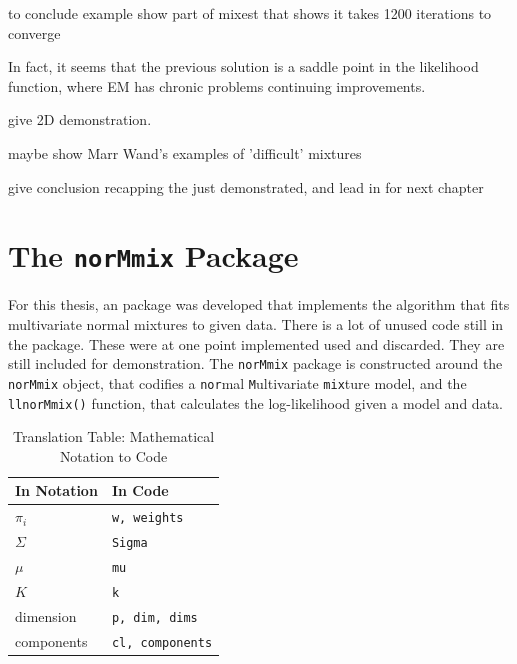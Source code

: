 to conclude example show part of mixest that shows it takes 1200 iterations to converge

In fact, it seems that the previous solution is a saddle point in the likelihood function, where EM has chronic problems continuing improvements.

give 2D demonstration.

maybe show Marr Wand's examples of 'difficult' mixtures

give conclusion recapping the just demonstrated, and lead in for next chapter





\chapter{The {\tt norMmix} Package}

For this thesis, an \Rp package was developed that implements the algorithm
that fits multivariate normal mixtures to given data.
There is a lot of unused code still in the package. These were at one point
implemented used and discarded. They are still included for demonstration.
The {\tt norMmix} package is constructed around the {\tt norMmix} object, that 
codifies a {\tt nor}mal {\tt M}ultivariate {\tt mix}ture model,  and the {\tt 
llnorMmix()} function, that calculates the log-likelihood given a model and 
data.


\begin{table}
    \centering
    \begin{tabular}{l l}
        \hline
        In Notation & In Code \\
        \hline
        $\pi_i$     & {\tt w, weights} \\
        $\Sigma$    & {\tt Sigma} \\
        $\mu$       & {\tt mu} \\
        $K$         & {\tt k} \\
        dimension   & {\tt p, dim, dims} \\
        components  & {\tt cl, components} \\
        \hline
    \end{tabular}
    \caption{Translation Table: Mathematical Notation to \Rp Code}
    \label{tab:code-notation}
\end{table}


